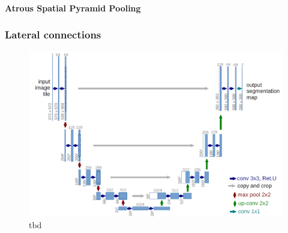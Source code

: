 \paragraph{Atrous Spatial Pyramid Pooling}


\subsubsection{Lateral connections}
\cite{RF15-U-Net}
\begin{figure}
	\includegraphics[width=\linewidth]{figures/chap223_Unet.png}
	\caption{tbd}
	\label{fig:ch2:sec2:unet}
\end{figure}



